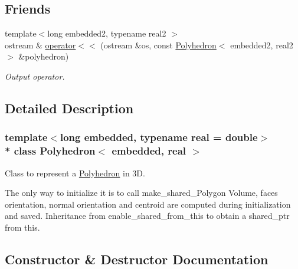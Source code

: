 \subsection*{Friends}
\begin{DoxyCompactItemize}
\item 
{\footnotesize template$<$long embedded2, typename real2 $>$ }\\ostream \& \hyperlink{class_polyhedron_a7aff04af00c6a08042a83db43caa4999}{operator$<$$<$} (ostream \&os, const \hyperlink{class_polyhedron}{Polyhedron}$<$ embedded2, real2 $>$ \&polyhedron)\hypertarget{class_polyhedron_a7aff04af00c6a08042a83db43caa4999}{}\label{class_polyhedron_a7aff04af00c6a08042a83db43caa4999}

\begin{DoxyCompactList}\small\item\em Output operator. \end{DoxyCompactList}\end{DoxyCompactItemize}


\subsection{Detailed Description}
\subsubsection*{template$<$long embedded, typename real = double$>$\\*
class Polyhedron$<$ embedded, real $>$}

Class to represent a \hyperlink{class_polyhedron}{Polyhedron} in 3D. 

The only way to initialize it is to call make\+\_\+shared\+\_\+\+Polygon Volume, faces orientation, normal orientation and centroid are computed during initialization and saved. Inheritance from enable\+\_\+shared\+\_\+from\+\_\+this to obtain a shared\+\_\+ptr from this. 

\subsection{Constructor \& Destructor Documentation}
